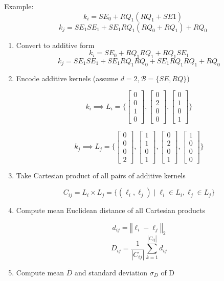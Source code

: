 \documentclass{article}
\begin{document}
Example:
\[k_i = SE_0 + RQ_1(RQ_1 + SE1)\]
\[k_j = SE_1 SE_1 + SE_1 RQ_1(RQ_0 + RQ_1)+RQ_0\]
\begin{enumerate}
\item Convert to additive form
\[k_i = SE_0 + RQ_1 RQ_1 + RQ_1 SE_1\]
\[k_j = SE_1 SE_1 + SE_1 RQ_1 RQ_0 + SE_1 RQ_1 RQ_1 + RQ_0\]

\item Encode additive kernels (assume $d=2, \mathcal{B} = \{SE, RQ\}$)

\[k_i \implies  L_i = \{
\begin{bmatrix} 0 \\0 \\ 1 \\ 0 \end{bmatrix}, 
\begin{bmatrix} 0 \\ 2 \\ 0 \\ 0 \end{bmatrix},
\begin{bmatrix} 0 \\ 1 \\ 0 \\ 1 \end{bmatrix}
\}\]
 
\[k_j \implies  L_j = \{
\begin{bmatrix} 0 \\ 0 \\ 0 \\ 2 \end{bmatrix}, 
\begin{bmatrix} 1 \\ 1 \\ 0 \\ 1 \end{bmatrix},
\begin{bmatrix} 0 \\ 2 \\ 0 \\ 1 \end{bmatrix},
\begin{bmatrix} 1 \\ 0 \\ 0 \\ 0 \end{bmatrix}
\}\]

\item Take Cartesian product of all pairs of additive kernels

\[C_{ij} = L_i\times L_j = \{(\ell_i, \ell_j) \mid \ell_i \in L_i,  \ell_j \in L_j\}\]

\item Compute mean Euclidean distance of all Cartesian products

\[d_{ij} = \left\Vert \ell_i - \ell_j \right\Vert_2\]
\[D_{ij} = \frac{1}{\left\vert C_{ij} \right\vert}\sum_{k=1}^{\left\vert C_{ij} \right\vert}d_{ij}\]

\item Compute mean $\bar{D}$ and standard deviation $\sigma_D$ of D

\end{enumerate}
\end{document}
